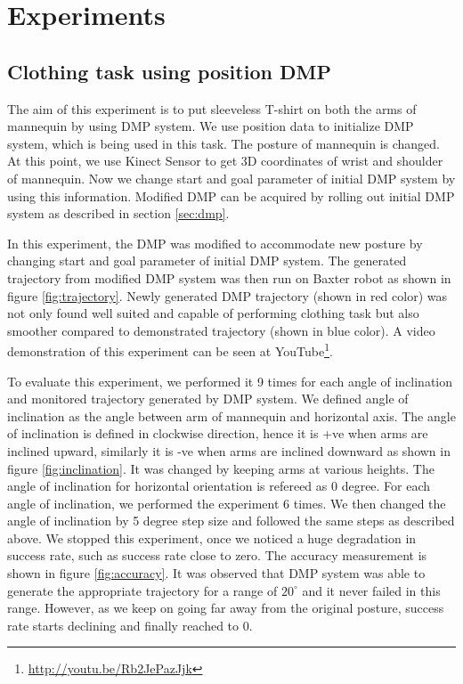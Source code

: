 \documentclass[sigconf]{acmart}
\begin{document}
\section{Experiments}
\label{sec:experiments}
\subsection{Clothing task using position DMP}
The aim of this experiment is to put sleeveless T-shirt on both the arms of mannequin by using DMP system. We use position data to initialize DMP system, which is being used in this task. The posture of mannequin is changed. At this point, we use Kinect Sensor to get 3D coordinates of wrist and shoulder of mannequin. Now we change start and goal parameter of initial DMP system by using this information. Modified DMP can be acquired by rolling out initial DMP system as described in section \ref{sec:dmp}.

In this experiment, the DMP was modified to accommodate new posture by changing start and goal parameter of initial DMP system. The generated trajectory from modified DMP system was then run on Baxter robot as shown in figure \ref{fig:trajectory}. Newly generated DMP trajectory (shown in red color) was not only found well suited and capable of performing clothing task but also smoother compared to demonstrated trajectory (shown in blue color). A video demonstration of this experiment can be seen at YouTube\footnote{\url{http://youtu.be/Rb2JePazJjk}}.

To evaluate this experiment, we performed it 9 times for each angle of inclination and monitored trajectory generated by DMP system. We defined angle of inclination as the angle between arm of mannequin and horizontal axis. The angle of inclination is defined in clockwise direction, hence it is +ve when arms are inclined upward, similarly it is -ve when arms are inclined downward as shown in figure \ref{fig:inclination}. It was changed by keeping arms at various heights. The angle of inclination for horizontal  orientation is refereed as 0 degree. For each angle of inclination, we performed the experiment 6 times. We then changed the angle of inclination by 5 degree step size and followed the same steps as described above. We stopped this experiment, once we noticed a huge degradation in success rate, such as success rate close to zero. The accuracy measurement is shown in figure \ref{fig:accuracy}. It was observed that DMP system was able to generate the appropriate trajectory for a range of $20^\circ$ and it never failed in this range. However, as we keep on going far away from the original posture, success rate starts declining and finally reached to $0$.
\end{document}
